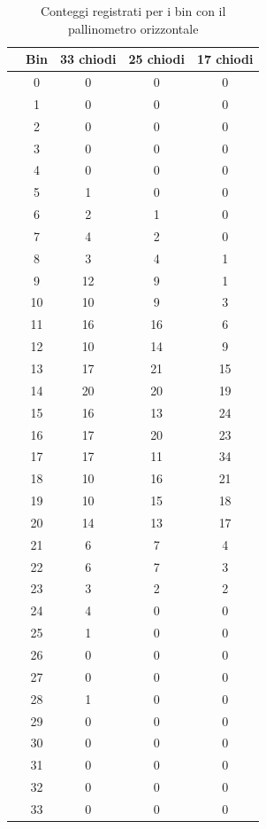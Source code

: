 \documentclass[10pt,oneside,a4paper]{article}
\begin{document}
\begin{table}[H]
\caption{Conteggi registrati per i bin con il pallinometro orizzontale}
\label{tab:palli_orizzontale}
\centering
\begin{tabular}{ccccc}
  \hline
 & Bin & 33 chiodi & 25 chiodi & 17 chiodi \\ 
  \hline
&0 & 0 & 0 & 0 \\  
&1 & 0 & 0 & 0 \\ 
  &2 & 0 & 0 & 0 \\ 
  &3 & 0 & 0 & 0 \\ 
  &4 & 0 & 0 & 0 \\ 
  &5 & 1 & 0 & 0 \\ 
  &6 & 2 & 1 & 0 \\ 
  &7 & 4 & 2 & 0 \\ 
  &8 & 3 & 4 & 1 \\ 
  &9 & 12 & 9 & 1 \\ 
  &10 & 10 & 9 & 3 \\ 
  &11 & 16 & 16 & 6 \\ 
  &12 & 10 & 14 & 9 \\ 
  &13 & 17 & 21 & 15 \\ 
  &14 & 20 & 20 & 19 \\ 
  &15 & 16 & 13 & 24 \\ 
  &16 & 17 & 20 & 23 \\ 
  &17 & 17 & 11 & 34 \\ 
  &18 & 10 & 16 & 21 \\ 
  &19 & 10 & 15 & 18 \\ 
  &20 & 14 & 13 & 17 \\ 
  &21 & 6 & 7 & 4 \\ 
  &22 & 6 & 7 & 3 \\ 
  &23 & 3 & 2 & 2 \\ 
  &24 & 4 & 0 & 0 \\ 
  &25 & 1 & 0 & 0 \\ 
  &26 & 0 & 0 & 0 \\ 
  &27 & 0 & 0 & 0 \\ 
  &28 & 1 & 0 & 0 \\ 
  &29 & 0 & 0 & 0 \\ 
  &30 & 0 & 0 & 0 \\ 
  &31 & 0 & 0 & 0 \\ 
  &32 & 0 & 0 & 0 \\ 
  &33 & 0 & 0 & 0 \\ 
   \hline
\end{tabular}
\end{table}
\end{document}
